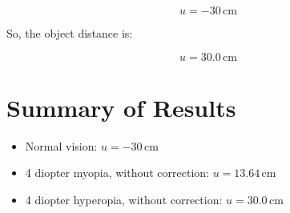 \[
u = -30 \, \text{cm}
\]

So, the object distance is:

\[
u = 30.0 \, \text{cm}
\]

\section*{Summary of Results}
\begin{itemize}
    \item Normal vision: $u = -30 \, \text{cm}$
    \item 4 diopter myopia, without correction: $u = 13.64 \, \text{cm}$
    \item 4 diopter hyperopia, without correction: $u = 30.0 \, \text{cm}$
\end{itemize}
